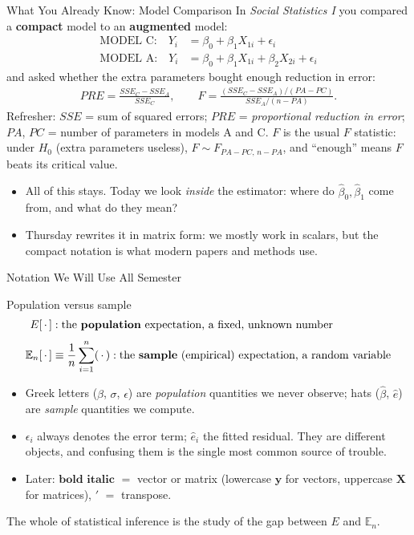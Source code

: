\documentclass[aspectratio=169,11pt,xcolor=dvipsnames]{beamer}
\newcommand{\E}{E}
\newcommand{\En}{\mathbb{E}_n}
\newcommand{\X}{\bm{X}}
\newcommand{\Y}{\bm{y}}
\begin{document}
\begin{frame}{What You Already Know: Model Comparison}
In \textit{Social Statistics I} you compared a \textbf{compact} model to an
\textbf{augmented} model:
\begin{align*}
  \text{MODEL C:}\quad Y_i &= \beta_0 + \beta_1 X_{1i} + \epsilon_i \\
  \text{MODEL A:}\quad Y_i &= \beta_0 + \beta_1 X_{1i} + \beta_2 X_{2i} + \epsilon_i
\end{align*}
and asked whether the extra parameters bought enough reduction in error:
\begin{align*}
  PRE = \frac{SSE_C - SSE_A}{SSE_C},
  \qquad
  F = \frac{(SSE_C - SSE_A)/(PA - PC)}{SSE_A/(n - PA)}.
\end{align*}
{\footnotesize Refresher: $SSE$ = sum of squared errors; $PRE$ =
\emph{proportional reduction in error}; $PA$, $PC$ = number of parameters in
models A and C. $F$ is the usual $F$ statistic: under $H_0$ (extra parameters
useless), $F \sim F_{PA-PC,\,n-PA}$, and ``enough'' means $F$ beats its
critical value.}
\pause
\begin{itemize}
  \item All of this stays. Today we look \emph{inside} the estimator: where do
        $\hat\beta_0,\hat\beta_1$ come from, and what do they mean?
  \item Thursday rewrites it in matrix form: we mostly work in scalars, but
        the compact notation is what modern papers and methods use.
\end{itemize}
\end{frame}

\begin{frame}{Notation We Will Use All Semester}
\begin{block}{Population versus sample}
\begin{align*}
  \E[\,\cdot\,] &: \text{the \textbf{population} expectation, a fixed, unknown number} \\[3pt]
  \En[\,\cdot\,] &\equiv \frac{1}{n}\sum_{i=1}^{n} (\,\cdot\,)
  : \text{the \textbf{sample} (empirical) expectation, a random variable}
\end{align*}
\end{block}
\vskip2pt
\begin{itemize}\itemsep3pt
  \item Greek letters ($\beta$, $\sigma$, $\epsilon$) are \emph{population}
        quantities we never observe; hats ($\hat\beta$, $\hat e$) are \emph{sample}
        quantities we compute.
  \item $\epsilon_i$ always denotes the error term; $\hat e_i$ the fitted residual.
        They are different objects, and confusing them is the single most common
        source of trouble.
  \item Later: $\bm{\text{bold italic}}$ $=$ vector or matrix (lowercase
        $\Y$ for vectors, uppercase $\X$ for matrices), $'$ $=$ transpose.
\end{itemize}
\vskip2pt
The whole of statistical inference is the study of the gap between $\E$ and $\En$.
\end{frame}
\end{document}
